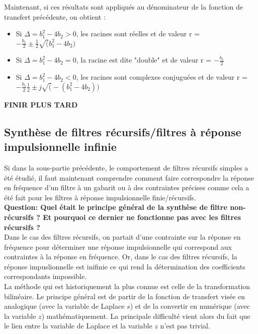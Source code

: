 \documentclass[11pt,a4paper]{article}
\begin{document}
Maintenant, si  ces résultats sont appliqués au dénominateur de la fonction de transfert précédente, on obtient :

\begin{itemize}
\item Si $\Delta = b_1^2 -4b_2 >0$, les racines sont réelles et de valeur r = $-\frac{b_1}{2} \pm \frac{1}{2}\sqrt(b_1^2 -4b_2)$
\item Si $\Delta = b_1^2 -4b_2 = 0$, la racine est dite "double" et de valeur r = $-\frac{b_1}{2}$
\item Si $\Delta = b_1^2 -4b_2 < 0$, les racines sont complexes conjuguées et de valeur r = $-\frac{b_1}{2} \frac{1}{2} \pm j\sqrt(-(b_1^2 -4b_2))$
\end{itemize}

\textbf{FINIR PLUS TARD \label{**to be finished IIR}}

\subsection{Synthèse de filtres récursifs/filtres à réponse impulsionnelle infinie}
Si dans la sous-partie précédente, le comportement de filtres récursifs simples a été étudié, il faut maintenant comprendre comment faire correspondre la réponse en fréquence d'un filtre à un gabarit ou à des contraintes précises comme cela a été fait pour les filtres à réponse impulsionnelle finie/récursifs.\\

\textbf{Question: Quel était le principe général de la synthèse de filtre non-récursifs ? Et pourquoi ce dernier ne fonctionne pas avec les filtres récursifs ?}\\

Dans le cas des filtres récursifs, on partait d'une contrainte sur la réponse en fréquence pour déterminer une réponse impulsionnelle qui correspond aux contraintes à la réponse en fréquence. Or, dans le cas des filtres récursifs, la réponse impuslionnelle est inifinie ce qui rend la détermination des coefficients correspondants impossible.\\

La méthode qui est historiquement la plus connue est celle de la transformation bilinéaire. Le principe général est de partir de la fonction  de transfert visée en analogique (avec la variable de Laplace $s$) et de la convertir en numérique (avec la variable $z$) mathématiquement. La principale difficulté  vient alors du fait que le lien entre la variable de Laplace et la variable $z$ n'est pas trivial.\\ 
\end{document}
